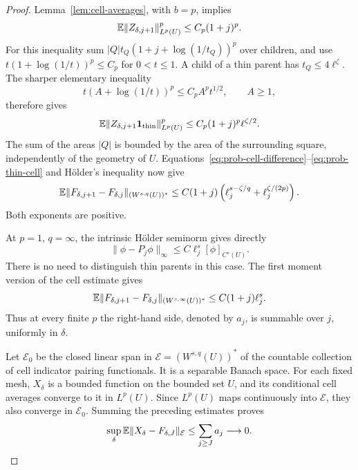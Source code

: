 \begin{proof}
Lemma~\ref{lem:cell-averages}, with \(b=p\), implies
\[
 \mathbb E\|Z_{\delta,j+1}\|_{L^p(U)}^p\le C_p(1+j)^p.
\]
For this inequality sum
\(|Q|t_Q(1+j+\log(1/t_Q))^p\) over children, and use
\(t(1+\log(1/t))^p\le C_p\) for \(0<t\le1\).
A child of a thin parent has \(t_Q\le4\ell^\zeta\).
The sharper elementary inequality
\[
 t(A+\log(1/t))^p\le C_p A^p t^{1/2},\qquad A\ge1,
\]
therefore gives
\begin{equation}\label{eq:prob-thin-cell}
 \mathbb E\|Z_{\delta,j+1}\mathbf1_{\mathrm{thin}}\|_{L^p(U)}^p
       \le C_p(1+j)^p\ell^{\zeta/2}.
\end{equation}
The sum of the areas \(|Q|\) is bounded by the area of the surrounding
square, independently of the geometry of \(U\).
Equations~\eqref{eq:prob-cell-difference}--\eqref{eq:prob-thin-cell}
and Hölder's inequality now give
\begin{equation}\label{eq:prob-dual-tail-step}
 \mathbb E\|F_{\delta,j+1}-F_{\delta,j}\|_{(W^{s,q}(U))^*}
 \le C(1+j)
       \left(\ell_j^{s-\zeta/q}+\ell_j^{\zeta/(2p)}\right).
\end{equation}
Both exponents are positive.

At \(p=1\), \(q=\infty\), the intrinsic Hölder seminorm gives directly
\[
 \|\phi-P_j\phi\|_\infty
       \le C\ell_j^s[\phi]_{C^s(U)}.
\]
There is no need to distinguish thin parents in this case. The first
moment version of the cell estimate gives
\begin{equation}\label{eq:prob-dual-endpoint}
 \mathbb E\|F_{\delta,j+1}-F_{\delta,j}\|_{(W^{s,\infty}(U))^*}
       \le C(1+j)\ell_j^s.
\end{equation}
Thus at every finite \(p\) the right-hand side, denoted by \(a_j\),
is summable over \(j\), uniformly in \(\delta\).

Let \(\mathcal E_0\) be the closed linear span in
\(\mathcal E=(W^{s,q}(U))^*\) of the countable collection of cell
indicator pairing functionals. It is a separable Banach space.
For each fixed mesh, \(X_\delta\) is a bounded function on the bounded
set \(U\), and its conditional cell averages converge to it in
\(L^p(U)\). Since \(L^p(U)\) maps continuously into \(\mathcal E\),
they also converge in \(\mathcal E_0\). Summing the preceding
estimates proves
\begin{equation}\label{eq:prob-dual-uniform-tail}
 \sup_\delta\mathbb E\|X_\delta-F_{\delta,J}\|_{\mathcal E}
       \le\sum_{j\ge J}a_j\longrightarrow0.
\end{equation}


\end{proof}
